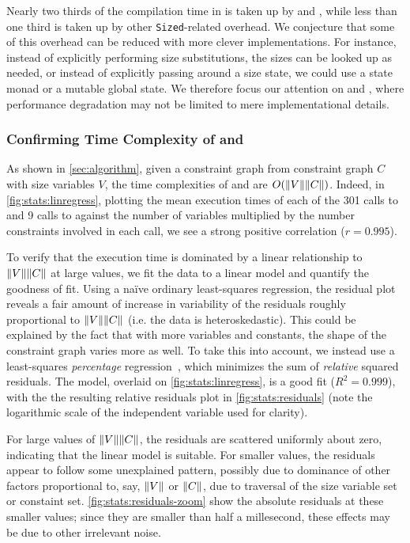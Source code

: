 Nearly two thirds of the compilation time in \fieldtheorysized is taken up by \solve and \RecCheck,
while less than one third is taken up by other \texttt{Sized}-related overhead.
We conjecture that some of this overhead can be reduced with more clever implementations.
For instance, instead of explicitly performing size substitutions, the sizes can be looked up as needed,
or instead of explicitly passing around a size state, we could use a state monad or a mutable global state.
We therefore focus our attention on \solve and \RecCheck, where performance degradation may not be limited to mere implementational details.



\subsubsection{Confirming Time Complexity of \solve and \RecCheck}

As shown in \autoref{sec:algorithm}, given a constraint graph from constraint graph $C$ with size variables $V$,
the time complexities of \solve and \RecCheck are $O(\lVert V\rVert\lVert C\rVert)$.
Indeed, in \autoref{fig:stats:linregress}, plotting the mean execution times of each of the 301 calls to \solve and 9 calls to \RecCheck
against the number of variables multiplied by the number constraints involved in each call,
we see a strong positive correlation ($r = 0.995$).

To verify that the execution time is dominated by a linear relationship to $\lVert V\rVert\lVert C\rVert$ at large values, we fit the data to a linear model and quantify the goodness of fit.
Using a na\"ive ordinary least-squares regression, the residual plot reveals a fair amount of increase in variability of the residuals roughly proportional to $\lVert V\rVert\lVert C\rVert$ (i.e. the data is heteroskedastic).
This could be explained by the fact that with more variables and constants, the shape of the constraint graph varies more as well.
To take this into account, we instead use a least-squares \emph{percentage} regression~\citep{lspr},
which minimizes the sum of \emph{relative} squared residuals.
The model, overlaid on \autoref{fig:stats:linregress}, is a good fit ($R^2 = 0.999$), with the the resulting relative residuals plot in \autoref{fig:stats:residuals}
(note the logarithmic scale of the independent variable used for clarity).

For large values of $\lVert V\rVert\lVert C\rVert$, the residuals are scattered uniformly about zero, indicating that the linear model is suitable.
For smaller values, the residuals appear to follow some unexplained pattern,
possibly due to dominance of other factors proportional to, say, $\lVert V\rVert$ or $\lVert C\rVert$, due to traversal of the size variable set or constaint set.
\autoref{fig:stats:residuals-zoom} show the absolute residuals at these smaller values;
since they are smaller than half a millesecond, these effects may be due to other irrelevant noise.


